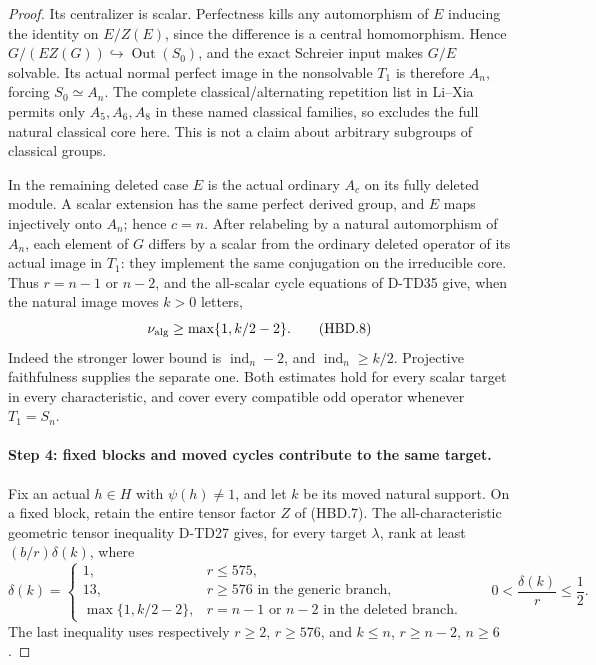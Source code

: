 \begin{proof}
Its centralizer is scalar.  Perfectness kills any automorphism
of $E$ inducing the identity on $E/Z(E)$, since the difference
is a central homomorphism.  Hence
$G/(EZ(G))\hookrightarrow\operatorname{Out}(S_0)$, and the
exact Schreier input makes $G/E$ solvable.
\cite[Theorem2.3, p.~1314]{HD:BabaiLuksSeress1997}
Its actual normal perfect image in the nonsolvable $T_1$ is
therefore $A_n$, forcing $S_0\simeq A_n$.
The complete classical/alternating repetition list in Li--Xia
permits only $A_5,A_6,A_8$ in these named classical families,
so excludes the full natural classical core here.
\cite[Section2.2.1, numbered author p.~13]{HES:LiXia2022}
This is not a claim about arbitrary subgroups of classical groups.

In the remaining deleted case $E$ is the actual ordinary
$A_c$ on its fully deleted module.  A scalar extension has
the same perfect derived group, and $E$ maps injectively onto
$A_n$; hence $c=n$.  After relabeling by a natural automorphism
of $A_n$, each element of $G$ differs by a scalar from the
ordinary deleted operator of its actual image in $T_1$:
they implement the same conjugation on the irreducible core.
Thus $r=n-1$ or $n-2$, and the all-scalar cycle equations of
D-TD35 give, when the natural image moves $k>0$ letters,
\[
             \nu_{\rm alg}\ge\max\{1,k/2-2\}.
 \tag{HBD.8}
\]
Indeed the stronger lower bound is $\operatorname{ind}_n-2$,
and $\operatorname{ind}_n\ge k/2$.  Projective faithfulness
supplies the separate one.  Both estimates hold for every
scalar target in every characteristic, and cover every
compatible odd operator whenever $T_1=S_n$.

\paragraph{Step 4: fixed blocks and moved cycles contribute to the same target.}
Fix an actual $h\in H$ with $\psi(h)\ne1$, and let $k$ be
its moved natural support.  On a fixed block, retain the entire
tensor factor $Z$ of (HBD.7).  The all-characteristic geometric
tensor inequality D-TD27 gives, for every target $\lambda$,
rank at least $(b/r)\delta(k)$, where
\[
 \delta(k)=
 \begin{cases}
 1,&r\le575,\\
 13,&r\ge576\text{ in the generic branch},\\
 \max\{1,k/2-2\},&r=n-1\text{ or }n-2\text{ in the deleted branch}.
 \end{cases}
 \qquad 0<\frac{\delta(k)}r\le\frac12.
 \tag{HBD.9}
\]
The last inequality uses respectively $r\ge2$, $r\ge576$,
and $k\le n$, $r\ge n-2$, $n\ge6$.


\end{proof}
